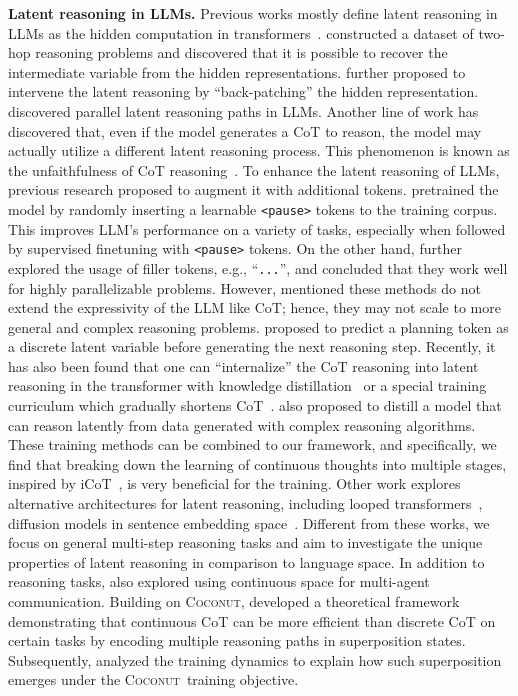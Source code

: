 \documentclass[]{fairmeta}
\newcommand{\ours}{\textsc{Coconut}\xspace}
\begin{document}
\noindent\textbf{Latent reasoning in LLMs.} Previous works mostly define latent reasoning in LLMs as the hidden computation in transformers~\citep{yang2024large, biran2024hopping}. \citet{yang2024large} constructed a dataset of two-hop reasoning problems and discovered that it is possible to recover the intermediate variable from the hidden representations. \citet{biran2024hopping} further proposed to intervene the latent reasoning by ``back-patching'' the hidden representation. \citet{shalev2024distributional} discovered parallel latent reasoning paths in LLMs. Another line of work has discovered that, even if the model generates a CoT to reason, the model may actually utilize a different latent reasoning process. This phenomenon is known as the unfaithfulness of CoT reasoning~\citep{wang2022towards, turpin2024language}. To enhance the latent reasoning of LLMs, previous research proposed to augment it with additional tokens. \citet{goyal2023think} pretrained the model by randomly inserting a learnable \texttt{<pause>} tokens to the training corpus. This improves LLM's performance on a variety of tasks, especially when followed by supervised finetuning with \texttt{<pause>} tokens. On the other hand, \citet{pfau2024let} further explored the usage of filler tokens, e.g., ``\texttt{...}'', and concluded that they work well for highly parallelizable problems. However, \citet{pfau2024let} mentioned these methods do not extend the expressivity of the LLM like CoT; hence, they may not scale to more general and complex reasoning problems. \citet{wang2023guiding} proposed to predict a planning token as a discrete latent variable before generating the next reasoning step. Recently, it has also been found that one can ``internalize'' the CoT reasoning into latent reasoning in the transformer with knowledge distillation~\citep{deng2023implicit} or a special training curriculum which gradually shortens CoT~\citep{deng2024explicit}. \citet{yu2024distilling} also proposed to distill a model that can reason latently from data generated with complex reasoning algorithms. These training methods can be combined to our framework, and specifically, we find that breaking down the learning of continuous thoughts into multiple stages, inspired by iCoT~\citep{deng2024explicit}, is very beneficial for the training. Other work explores alternative architectures for latent reasoning, including looped transformers~\citep{giannou2023looped, fan2024looped}, diffusion models in sentence embedding space~\citep{barrault2024large}. Different from these works, we focus on general multi-step reasoning tasks and aim to investigate the unique properties of latent reasoning in comparison to language space. In addition to reasoning tasks,
\citet{pham2023let} also explored using continuous space for multi-agent communication. Building on \ours, \citet{zhu2025reasoning} developed a theoretical framework demonstrating that continuous CoT can be more efficient than discrete CoT on certain tasks by encoding multiple reasoning paths in superposition states. Subsequently, \citet{zhu2025emergence} analyzed the training dynamics to explain how such superposition emerges under the \ours\ training objective.
\end{document}
